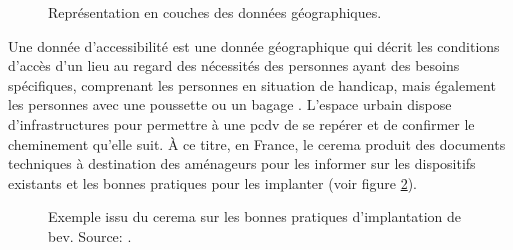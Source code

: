 \begin{figure}[ht]
    \centering
    \caption[Représentation en couche des données géographiques]{Représentation en couches des données géographiques.}
    \label{fig:geodatalayers}
\end{figure}

\newpar{}


Une donnée d'accessibilité est une donnée géographique qui décrit les conditions d'accès d'un lieu au regard des nécessités des personnes ayant des besoins spécifiques, comprenant les personnes en situation de handicap, mais également les personnes avec une poussette ou un bagage \citep{Ding2014}. L'espace urbain dispose d'infrastructures pour permettre à une \gls{pcdv} de se repérer et de confirmer le cheminement qu'elle suit. À ce titre, en France, le \gls{cerema} produit des documents techniques à destination des aménageurs pour les informer sur les dispositifs existants et les bonnes pratiques pour les implanter (voir figure \ref{fig:ea_exemple_cerema_bev}).

\begin{figure}[ht]
    \centering
    \caption[Bonnes pratiques d'implantation des pavages tactiles]{Exemple issu du \gls{cerema} sur les bonnes pratiques d'implantation de \gls{bev}. Source: \citep{CEREMA2022}.}
    \label{fig:ea_exemple_cerema_bev}
\end{figure}


